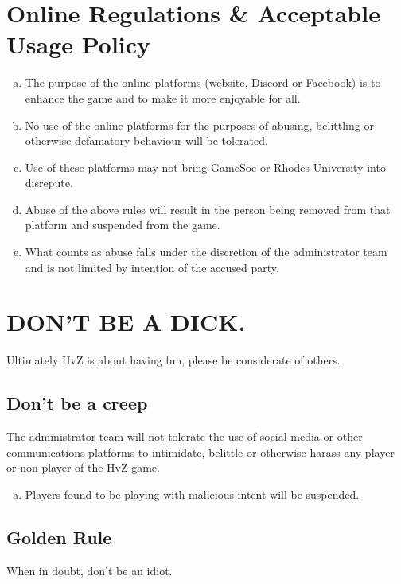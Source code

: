\documentclass[a4paper,12pt]{article}
\begin{document}
\section{Online Regulations \& Acceptable Usage Policy}
\begin{enumerate}[(a)]
\item The purpose of the online platforms (website, Discord or Facebook) is to enhance the game and to make it more enjoyable for all. 
\item No use of the online platforms for the purposes of abusing, belittling or otherwise defamatory behaviour will be tolerated.
\item Use of these platforms may not bring GameSoc or Rhodes University into disrepute.
\item Abuse of the above rules will result in the person being removed from that platform and suspended from the game. 
\item What counts as abuse falls under the discretion of the administrator team and is not limited by intention of the accused party.
\end{enumerate}

\section{DON'T BE A DICK.}
\label{dbad}
Ultimately HvZ is about having fun, please be considerate of others.

\subsection{Don't be a creep}
The administrator team will not tolerate the use of social media or other communications platforms to intimidate, belittle or otherwise harass any player or non-player of the HvZ game.

\begin{enumerate}[(a)]
\item Players found to be playing with malicious intent will be suspended.
\end{enumerate}


\subsection{Golden Rule}
When in doubt, don't be an idiot. 



\end{document}
